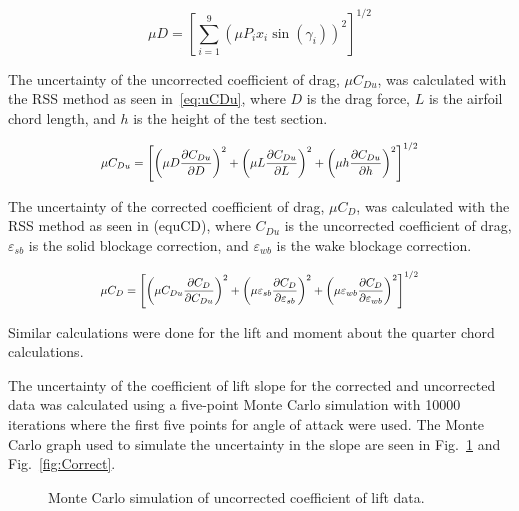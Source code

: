 \documentclass[journal,letterpaper]{IEEEtran}
\begin{document}
\begin{equation} \label{eq:uFD}
    \mu D = \left[\sum_{i=1}^9 \left(\mu P_i x_i \sin\left(\gamma_i\right)\right)^2\right]^{1/2}
\end{equation}

The uncertainty of the uncorrected coefficient of drag, $\mu C_{Du}$, was calculated with the RSS method as seen in~\eqref{eq:uCDu}, where $D$ is the drag force, $L$ is the airfoil chord length, and $h$ is the height of the test section.

\begin{equation} \label{eq:uCDu}
    \resizebox{227pt}{!}{$\displaystyle{\mu C_{Du} = \left[\left(\mu D \frac{\partial C_{Du}}{\partial D}\right)^2 + \left(\mu L \frac{\partial C_{Du}}{\partial L}\right)^2 + \left(\mu h \frac{\partial C_{Du}}{\partial h}\right)^2\right]^{1/2}}$}
\end{equation}

The uncertainty of the corrected coefficient of drag, $\mu C_D$, was calculated with the RSS method as seen in (equCD), where $C_{Du}$ is the uncorrected coefficient of drag, $\varepsilon_{sb}$ is the solid blockage correction, and $\varepsilon_{wb}$ is the wake blockage correction.

\begin{equation} \label{eq:uCDu}
    \resizebox{227pt}{!}{$\displaystyle{\mu C_{D} = \left[\left(\mu C_{Du} \frac{\partial C_{D}}{\partial C_{Du}}\right)^2 + \left(\mu \varepsilon_{sb} \frac{\partial C_{D}}{\partial \varepsilon_{sb}}\right)^2 + \left(\mu \varepsilon_{wb} \frac{\partial C_{D}}{\partial \varepsilon_{wb}}\right)^2\right]^{1/2}}$}
\end{equation}

Similar calculations were done for the lift and moment about the quarter chord calculations.

The uncertainty of the coefficient of lift slope for the corrected and uncorrected data was calculated using a five-point Monte Carlo simulation with 10000 iterations where the first five points for angle of attack were used.
The Monte Carlo graph used to simulate the uncertainty in the slope are seen in Fig.~\ref{fig:Incorrect} and Fig.~\ref{fig:Correct}.

\begin{figure}[H]
    \centering
    
    \caption{Monte Carlo simulation of uncorrected coefficient of lift data.}
    \label{fig:Incorrect}
\end{figure}
\end{document}

